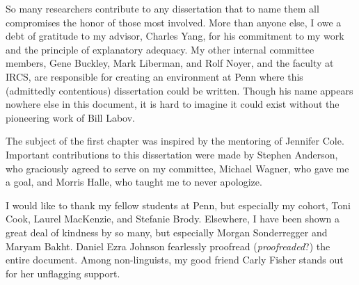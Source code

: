 So many researchers contribute to any dissertation that to name them all compromises the honor of those most involved. More than anyone else, I owe a debt of gratitude to my advisor, Charles Yang, for his commitment to my work and the principle of explanatory adequacy. My other internal committee members, Gene Buckley, Mark Liberman, and Rolf Noyer, and the faculty at IRCS, are responsible for creating an environment at Penn where this (admittedly contentious) dissertation could be written. Though his name appears nowhere else in this document, it is hard to imagine it could exist without the pioneering work of Bill Labov.

The subject of the first chapter was inspired by the mentoring of Jennifer Cole. Important contributions to this dissertation were made by Stephen Anderson, who graciously agreed to serve on my committee, Michael Wagner, who gave me a goal, and Morris Halle, who taught me to never apologize.

I would like to thank my fellow students at Penn, but especially my cohort, Toni Cook, Laurel MacKenzie, and Stefanie Brody. Elsewhere, I have been shown a great deal of kindness by so many, but especially Morgan Sonderregger and Maryam Bakht. Daniel Ezra Johnson fearlessly proofread (\emph{proofreaded}?) the entire document. Among non-linguists, my good friend Carly Fisher stands out for her unflagging support. 

